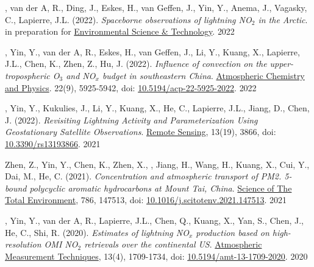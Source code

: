 \vspace{0.5em}

\begin{cvpublications}

\publication
{, van der A, R., Ding, J., Eskes, H., van Geffen, J.,
Yin, Y., Anema, J., Vagasky, C., Lapierre, J.L. (2022).
\emph{Spaceborne observations of lightning NO$_2$ in the Arctic}.
in preparation for \underline{Environmental Science \& Technology}.} %
{2022} %

\publication
{, Yin, Y., van der A, R., Eskes, H., van Geffen, J.,
Li, Y., Kuang, X., Lapierre, J.L., Chen, K., Zhen, Z., Hu, J. (2022).
\emph{Influence of convection on the upper-tropospheric O$_3$ and NO$_x$ budget in southeastern China}.
\underline{Atmospheric Chemistry and Physics}.
22(9), 5925-5942, doi: \href{https://doi.org/10.5194/acp-22-5925-2022}{10.5194/acp-22-5925-2022}.} %
{2022} %

\publication
{, Yin, Y., Kukulies, J., Li, Y., Kuang, X.,
He, C., Lapierre, J.L., Jiang, D., Chen, J. (2022).
\emph{Revisiting Lightning Activity and Parameterization Using
Geostationary Satellite Observations}.
\underline{Remote Sensing}, 13(19), 3866,
doi: \href{https://doi.org/10.3390/rs13193866}{10.3390/rs13193866}.} %
{2021} %

\publication
{Zhen, Z., Yin, Y., Chen, K., Zhen, X., ,
Jiang, H., Wang, H., Kuang, X., Cui, Y., Dai, M., He, C. (2021).
\emph{Concentration and atmospheric transport of PM2. 5-bound polycyclic aromatic hydrocarbons at Mount Tai, China}.
\underline{Science of The Total Environment}, 786, 147513,
doi: \href{https://doi.org/10.1016/j.scitotenv.2021.147513}{10.1016/j.scitotenv.2021.147513}.} %
{2021} %

\publication
{, Yin, Y., van der A, R., Lapierre, J.L.,
Chen, Q., Kuang, X., Yan, S., Chen, J., He, C., Shi, R. (2020).
\emph{Estimates of lightning NO$_x$ production based on high-resolution OMI NO$_2$ retrievals over the continental US}.
\underline{Atmospheric Measurement Techniques}, 13(4), 1709-1734,
doi: \href{https://doi.org/10.5194/amt-13-1709-2020}{10.5194/amt-13-1709-2020}.} %
{2020} %


\end{cvpublications}
